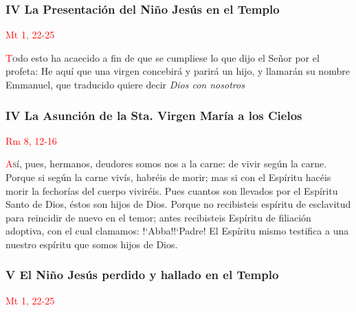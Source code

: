 \documentclass[10pt,twoside]{book}
\begin{document}
\begin{paracol}{2}
      \begin{leftcolumn*}
            \begin{center}
                  \subsubsection*{IV La Presentación del Niño Jesús en el Templo}
                  \textcolor{red}{Mt 1, 22-25}
            \end{center}

            \lettrine[lines=2]{\textcolor{red}{T}}odo esto ha acaecido a fin de que se cumpliese lo que dijo el Señor por el profeta: He aquí que una virgen concebirá y parirá
            un hijo, y llamarán su nombre Emmanuel, que traducido quiere decir \textit{Dios con nosotros}

            
      \end{leftcolumn*}
      \begin{rightcolumn}
            \begin{center}
                  \subsubsection*{IV La Asunción de la Sta. Virgen María a los Cielos}
                  \textcolor{red}{Rm 8, 12-16}
            \end{center}

            \lettrine[lines=2]{\textcolor{red}{A}}sí, pues, hermanos, deudores somos nos a la carne: de vivir según la carne. Porque si según la carne vivís, habréis de morir; mas
            si con el Espíritu hacéis morir la fechorías del cuerpo viviréis. Pues cuantos son llevados por el Espíritu Santo de Dios, éstos son hijos de Dios. Porque no recibisteis
            espíritu de esclavitud para reincidir de nuevo en el temor; antes recibisteis Espíritu de filiación adoptiva, con el cual clamamos: {!`}Abba!{!`}Padre! El Espíritu mismo
            testifica a una nuestro espíritu que somos hijos de Dios.

            
      \end{rightcolumn}

      \begin{leftcolumn*}
            \begin{center}
                  \subsubsection*{V El Niño Jesús perdido y hallado en el Templo}
                  \textcolor{red}{Mt 1, 22-25}
            \end{center}


\end{leftcolumn*}
\end{paracol}
\end{document}
